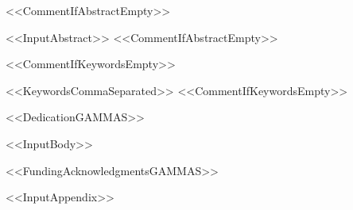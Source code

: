 \documentclass[%
usebiber,
<<DocumentClassOptions>>]{gammas}
\begin{document}
\maketitle

<<CommentIfAbstractEmpty>>\begin{gammabstract}
<<InputAbstract>>
<<CommentIfAbstractEmpty>>\end{gammabstract}

<<CommentIfKeywordsEmpty>>\begin{gammkeywords}
<<KeywordsCommaSeparated>>
<<CommentIfKeywordsEmpty>>\end{gammkeywords}

\newenvironment{gammdedication}{\indent\textbf{Dedication:}\begin{itshape}}{\end{itshape}\par}
<<DedicationGAMMAS>>

<<InputBody>>

<<FundingAcknowledgmentsGAMMAS>>

\appendix
<<InputAppendix>>

\end{document}
